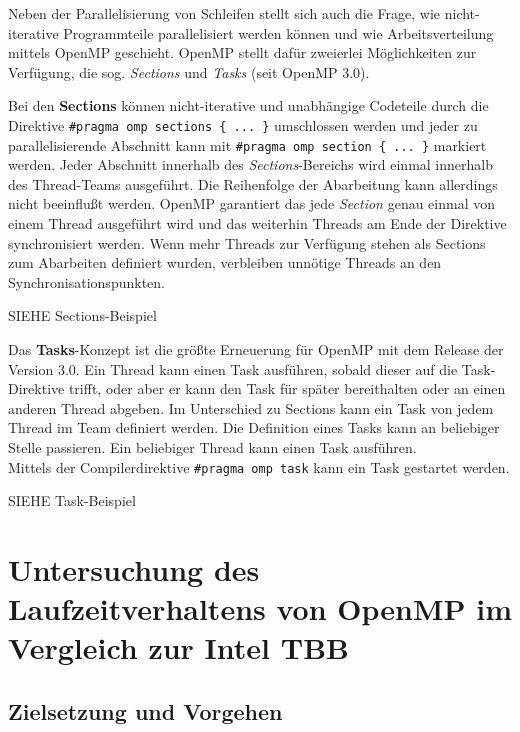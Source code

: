 \documentclass[11pt]{scrartcl}
\begin{document}
Neben der Parallelisierung von Schleifen stellt sich auch die Frage, wie nicht-iterative Programmteile parallelisiert werden können und  wie Arbeitsverteilung mittels OpenMP geschieht. OpenMP stellt dafür zweierlei Möglichkeiten zur Verfügung, die sog. \textit{Sections} und \textit{Tasks} (seit OpenMP 3.0).

Bei den \textbf{Sections} können nicht-iterative und unabhängige Codeteile durch die Direktive \texttt{\#pragma omp sections \{ ... \}} umschlossen werden und jeder zu parallelisierende Abschnitt kann mit \texttt{\#pragma omp section \{ ... \}} markiert werden. Jeder Abschnitt innerhalb des \textit{Sections}-Bereichs wird einmal innerhalb des Thread-Teams ausgeführt. Die Reihenfolge der Abarbeitung kann allerdings nicht beeinflußt werden. OpenMP garantiert das jede \textit{Section} genau einmal von einem Thread ausgeführt wird und das weiterhin Threads am Ende der Direktive synchronisiert werden. Wenn mehr Threads zur Verfügung stehen als Sections zum Abarbeiten definiert wurden, verbleiben unnötige Threads an den Synchronisationspunkten.

SIEHE Sections-Beispiel

Das \textbf{Tasks}-Konzept ist die größte Erneuerung für OpenMP mit dem Release der Version 3.0. Ein Thread kann einen Task ausführen, sobald dieser auf die Task-Direktive trifft, oder aber er kann den Task für später bereithalten oder an einen anderen Thread abgeben. Im Unterschied zu Sections kann ein Task von jedem Thread im Team definiert werden. Die Definition eines Tasks kann an beliebiger Stelle passieren. Ein beliebiger Thread kann einen Task ausführen. \\
Mittels der Compilerdirektive \texttt{\#pragma omp task} kann ein Task gestartet werden. 

SIEHE Task-Beispiel 

\pagebreak %

\section{Untersuchung des Laufzeitverhaltens von OpenMP im Vergleich zur Intel TBB}

\subsection{Zielsetzung und Vorgehen}
\end{document}
